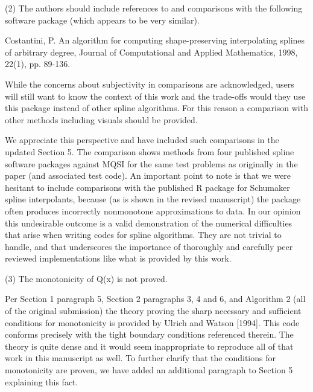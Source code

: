 \goodbreak
{\parindent=20pt \it

\item{(2)} The authors should include references to and comparisons
  with the following software package (which appears to be very
  similar).

\itemitem{} Costantini, P. An algorithm for computing shape-preserving
  interpolating splines of arbitrary degree, Journal of Computational
  and Applied Mathematics, 1998, 22(1), pp. 89-136.

\item{} While the concerns about subjectivity in comparisons are
  acknowledged, users will still want to know the context of this work
  and the trade-offs would they use this package instead of other
  spline algorithms. For this reason a comparison with other methods
  including visuals should be provided.

}

We appreciate this perspective and have included such comparisons in
the updated Section 5. The comparison shows methods from four
published spline software packages against MQSI for the same test
problems as originally in the paper (and associated test code). An
important point to note is that we were hesitant to include
comparisons with the published R package for Schumaker spline
interpolants, because (as is shown in the revised manuscript) the
package often produces incorrectly nonmonotone approximations to
data. In our opinion this undesirable outcome is a valid demonstration
of the numerical difficulties that arise when writing codes for spline
algorithms. They are not trivial to handle, and that underscores the
importance of thoroughly and carefully peer reviewed implementations
like what is provided by this work.


\goodbreak
{\parindent=20pt \it

\item{(3)} The monotonicity of Q(x) is not proved.

}

Per Section 1 paragraph 5, Section 2 paragraphs 3, 4 and 6, and
Algorithm 2 (all of the original submission) the theory proving the
sharp necessary and sufficient conditions for monotonicity is provided
by Ulrich and Watson [1994]. This code conforms precisely with the
tight boundary conditions referenced therein. The theory is quite
dense and it would seem inappropriate to reproduce all of that work in
this manuscript as well. To further clarify that the conditions for
monotonicity are proven, we have added an additional paragraph to
Section 5 explaining this fact.


